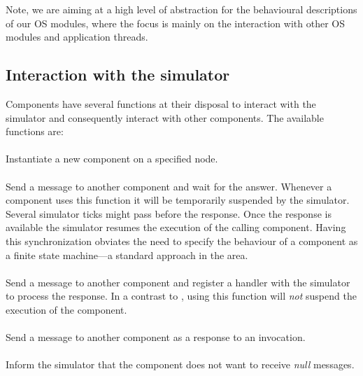 Note, we are aiming at a high level of abstraction for the behavioural
descriptions of our OS modules, where the focus is mainly on the
interaction with other OS modules and application threads.


\subsection{Interaction with the simulator}

Components have several functions at their disposal to interact with
the simulator and consequently interact with other components.  The
available functions are:

\paragraph{}
Instantiate a new component on a specified node. 
\paragraph{}
Send a message to another component and wait for the answer.  Whenever a component uses this function it will be
temporarily suspended by the simulator.  Several simulator ticks
might pass before the %
response.  Once the response is
available the simulator resumes the execution of the calling
component.  Having this synchronization obviates the need to specify
the behaviour of a component as a finite state machine---a standard
approach in the area.
\paragraph{}
Send a message to another component and register a handler with the
simulator to process the response.  In a contrast to ,
using this function will \emph{not} suspend the execution of the
component.
\paragraph{}
Send a message to another component as a response to an invocation.
\paragraph{}
Inform the simulator that the component does not want to receive
\emph{null} messages.
